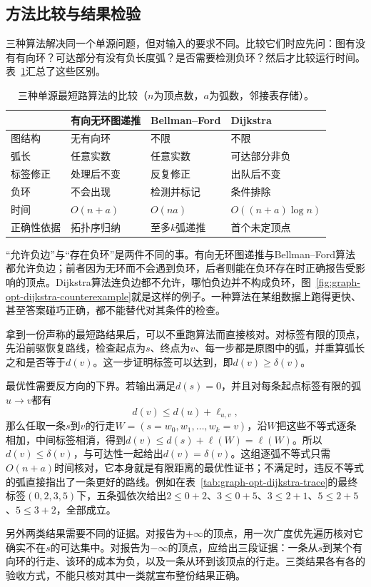 \subsection{方法比较与结果检验}
\label{sec:graph-opt-shortest-path-comparison}

三种算法解决同一个单源问题，但对输入的要求不同。比较它们时应先问：图有没有有向环？可达部分有没有负长度弧？是否需要检测负环？然后才比较运行时间。表~\ref{tab:graph-opt-shortest-path-methods}汇总了这些区别。

\begin{table}[!htb]
  \centering
  \caption{三种单源最短路算法的比较（$n$为顶点数，$a$为弧数，邻接表存储）。}
  \label{tab:graph-opt-shortest-path-methods}
  \begin{tabular}{llll}
    \toprule
    & 有向无环图递推 & Bellman--Ford & Dijkstra \\
    \midrule
    图结构 & 无有向环 & 不限 & 不限 \\
    弧长 & 任意实数 & 任意实数 & 可达部分非负 \\
    标签修正 & 处理后不变 & 反复修正 & 出队后不变 \\
    负环 & 不会出现 & 检测并标记 & 条件排除 \\
    时间 & $O(n+a)$ & $O(na)$ & $O((n+a)\log n)$ \\
    正确性依据 & 拓扑序归纳 & 至多$k$弧递推 & 首个未定顶点 \\
    \bottomrule
  \end{tabular}
\end{table}

“允许负边”与“存在负环”是两件不同的事。有向无环图递推与Bellman--Ford算法都允许负边；前者因为无环而不会遇到负环，后者则能在负环存在时正确报告受影响的顶点。Dijkstra算法连负边都不允许，哪怕负边并不构成负环，图~\ref{fig:graph-opt-dijkstra-counterexample}就是这样的例子。一种算法在某组数据上跑得更快、甚至答案碰巧正确，都不能替代对其条件的检查。

拿到一份声称的最短路结果后，可以不重跑算法而直接核对。对标签有限的顶点，先沿前驱恢复路线，检查起点为$s$、终点为$v$、每一步都是原图中的弧，并重算弧长之和是否等于$d(v)$。这一步证明标签可以达到，即$d(v)\geq\delta(v)$。

最优性需要反方向的下界。若输出满足$d(s)=0$，并且对每条起点标签有限的弧$u\to v$都有
\[
  d(v)\leq d(u)+\ell_{u,v},
\]
那么任取一条$s$到$v$的行走$W=(s=w_0,w_1,\ldots,w_k=v)$，沿$W$把这些不等式逐条相加，中间标签相消，得到$d(v)\leq d(s)+\ell(W)=\ell(W)$。所以$d(v)\leq\delta(v)$，与可达性一起给出$d(v)=\delta(v)$。这组逐弧不等式只需$O(n+a)$时间核对，它本身就是有限距离的最优性证书；不满足时，违反不等式的弧直接指出了一条更好的路线。例如在表~\ref{tab:graph-opt-dijkstra-trace}的最终标签$(0,2,3,5)$下，五条弧依次给出$2\leq0+2$、$3\leq0+5$、$3\leq2+1$、$5\leq2+5$、$5\leq3+2$，全部成立。

另外两类结果需要不同的证据。对报告为$+\infty$的顶点，用一次广度优先遍历核对它确实不在$s$的可达集中。对报告为$-\infty$的顶点，应给出三段证据：一条从$s$到某个有向环的行走、该环的成本为负，以及一条从环到该顶点的行走。三类结果各有各的验收方式，不能只核对其中一类就宣布整份结果正确。
